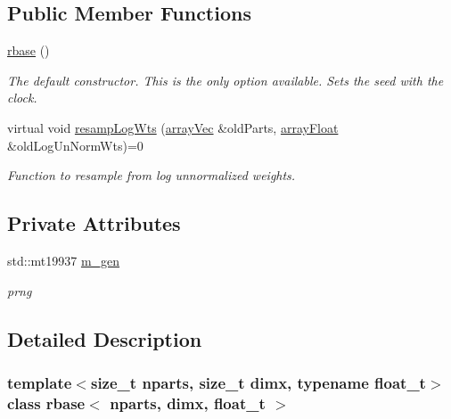 \subsection*{Public Member Functions}
\begin{DoxyCompactItemize}
\item 
\mbox{\label{classrbase_aae80801bfc60ee3573cb728fc9460b0c}} 
\hyperlink{classrbase_aae80801bfc60ee3573cb728fc9460b0c}{rbase} ()
\begin{DoxyCompactList}\small\item\em The default constructor. This is the only option available. Sets the seed with the clock. \end{DoxyCompactList}\item 
virtual void \hyperlink{classrbase_aff0f6f88fd4656e67f5ebc870f10dd44}{resamp\+Log\+Wts} (\hyperlink{classrbase_aa12fc826befa6ba0647b5f59ebc396ee}{array\+Vec} \&old\+Parts, \hyperlink{classrbase_a6f76bef853e508cb5b6f546d231b06f5}{array\+Float} \&old\+Log\+Un\+Norm\+Wts)=0
\begin{DoxyCompactList}\small\item\em Function to resample from log unnormalized weights. \end{DoxyCompactList}\end{DoxyCompactItemize}
\subsection*{Private Attributes}
\begin{DoxyCompactItemize}
\item 
\mbox{\label{classrbase_ac278c975bd5b23ad009f1ce685552c5c}} 
std\+::mt19937 \hyperlink{classrbase_ac278c975bd5b23ad009f1ce685552c5c}{m\+\_\+gen}
\begin{DoxyCompactList}\small\item\em prng \end{DoxyCompactList}\end{DoxyCompactItemize}


\subsection{Detailed Description}
\subsubsection*{template$<$size\+\_\+t nparts, size\+\_\+t dimx, typename float\+\_\+t$>$\newline
class rbase$<$ nparts, dimx, float\+\_\+t $>$}

